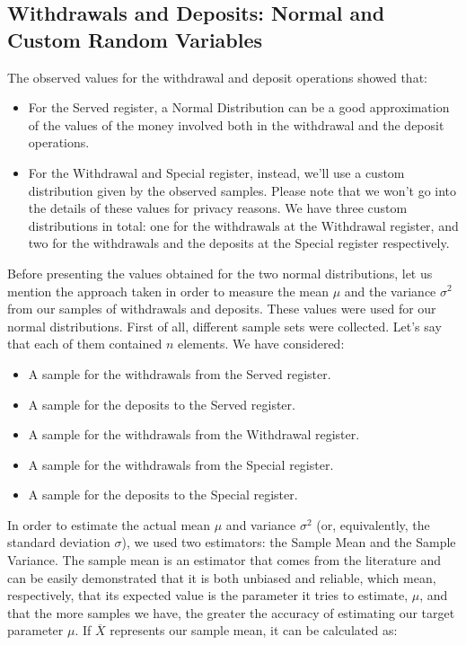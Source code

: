 \documentclass{article}
\begin{document}
\subsection{Withdrawals and Deposits: Normal and Custom Random Variables}
The observed values for the withdrawal and deposit operations showed that:
\begin{itemize}
    \item For the Served register, a Normal Distribution can be a good approximation of the values of the money involved both in the withdrawal and the deposit operations.
    \item For the Withdrawal and Special register, instead, we'll use a custom distribution given by the observed samples. Please note that we won't go into the details of these values for privacy reasons. We have three custom distributions in total: one for the withdrawals at the Withdrawal register, and two for the withdrawals and the deposits at the Special register respectively.
\end{itemize} 
Before presenting the values obtained for the two normal distributions, let us mention the approach taken in order to measure the mean $\mu$ and the variance $\sigma^{2}$ from our samples of withdrawals and deposits. These values were used for our normal distributions.
\newline First of all, different sample sets were collected. Let's say that each of them contained $n$ elements. We have considered:
\begin{itemize}
    \item A sample for the withdrawals from the Served register.
    \item A sample for the deposits to the Served register.
    \item A sample for the withdrawals from the Withdrawal register.
    \item A sample for the withdrawals from the Special register.
    \item A sample for the deposits to the Special register. 
\end{itemize}
In order to estimate the actual mean $\mu$ and variance $\sigma^{2}$ (or, equivalently, the standard deviation $\sigma$), we used two estimators: the Sample Mean and the Sample Variance.
\newline The sample mean is an estimator that comes from the literature and can be easily demonstrated that it is both unbiased and reliable, which mean, respectively, that its expected value is the parameter it tries to estimate, $\mu$, and that the more samples we have, the greater the accuracy of estimating our target parameter $\mu$. If $\overline{X}$ represents our sample mean, it can be calculated as:
      
\end{document}
